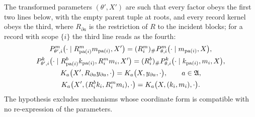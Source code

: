 The transformed parameters $(\theta',X')$ are such that every factor obeys the first two lines below,
with the empty parent tuple at roots, and every record kernel obeys the third, where $R_{\partial a}$ is
the restriction of $R$ to the incident blocks; for a record with scope $\{i\}$ the third line reads as
the fourth:
\begin{gather}
P_{\theta',i}^{m}\bigl(\cdot\mid R_{\operatorname{pa}(i)}^mm_{\operatorname{pa}(i)},X'\bigr)
=(R_i^m)_\#P_{\theta,i}^{m}\bigl(\cdot\mid m_{\operatorname{pa}(i)},X\bigr),
\label{eq:gen-gauge-pushforward-model}\\
P_{\theta',i}^{k}\bigl(\cdot\mid R_{\operatorname{pa}(i)}^bk_{\operatorname{pa}(i)},R_i^mm_i,X'\bigr)
=(R_i^b)_\#P_{\theta,i}^{k}\bigl(\cdot\mid k_{\operatorname{pa}(i)},m_i,X\bigr),
\label{eq:gen-gauge-pushforward-state}\\
K_a\bigl(X',R_{\partial a}y_{\partial a},\cdot\bigr)=K_a\bigl(X,y_{\partial a},\cdot\bigr),
\qquad a\in\mathfrak A,
\label{eq:gen-gauge-record-kernel}\\
K_a\bigl(X',(R_i^bk_i,R_i^mm_i),\cdot\bigr)=K_a\bigl(X,(k_i,m_i),\cdot\bigr).
\label{eq:gen-gauge-pushforward-obs}
\end{gather}
The hypothesis excludes mechanisms whose coordinate form is compatible with no re-expression of the
parameters.

